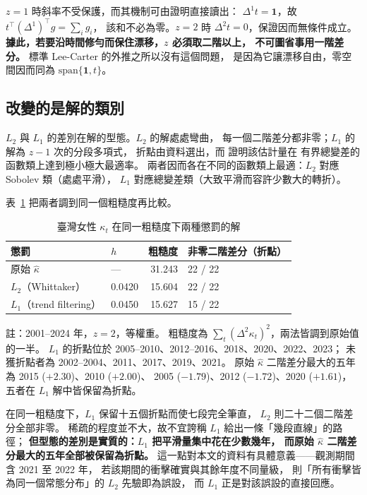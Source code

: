 \documentclass[UTF8, fontset=macnew, a4paper, 12pt]{ctexart}
\begin{document}
$z=1$ 時斜率不受保護，而其機制可由證明直接讀出：
$\Delta^{1}t=\mathbf 1$，故 $t^{\top}(\Delta^{1})^{\top}g=\sum_i g_i$，
該和不必為零。$z=2$ 時 $\Delta^{2}t=0$，保證因而無條件成立。
\textbf{據此，若要沿時間修勻而保住漂移，$z$ 必須取二階以上， 不可圖省事用一階差分。} 標準 Lee-Carter 的外推之所以沒有這個問題，
是因為它讓漂移自由，零空間因而同為 $\mathrm{span}\{\mathbf 1,t\}$。

\subsection{改變的是解的類別}\label{subsec:l1-sol}

$L_2$ 與 $L_1$ 的差別在解的型態。$L_2$ 的解處處彎曲，
每一個二階差分都非零；$L_1$ 的解為 $z-1$ 次的分段多項式，
折點由資料選出，而 \citet{tibshiraniRJ2014} 證明該估計量在
有界總變差的函數類上達到極小極大最適率。
兩者因而各在不同的函數類上最適：$L_2$ 對應 Sobolev 類（處處平滑），
$L_1$ 對應總變差類（大致平滑而容許少數大的轉折）。

表~\ref{tab:l1kappa} 把兩者調到同一個粗糙度再比較。

\begin{table}[H]
\centering
\caption{臺灣女性 $\kappa_t$ 在同一粗糙度下兩種懲罰的解}
\small
\renewcommand{\arraystretch}{1.1}
\begin{tabular}{llrl}
\toprule
懲罰 & $h$ & 粗糙度 & 非零二階差分（折點）\\
\midrule
原始 $\hat\kappa$ & — & 31.243 & 22 / 22\\
$L_2$（Whittaker） & 0.0420 & 15.604 & 22 / 22\\
$L_1$（trend filtering） & 0.0450 & 15.627 & 15 / 22\\
\bottomrule
\end{tabular}

\vspace{2pt}
\parbox{0.92\textwidth}{\footnotesize 註：2001--2024 年，$z=2$，等權重。
粗糙度為 $\sum_t(\Delta^2\kappa_t)^2$，兩法皆調到原始值的一半。
$L_1$ 的折點位於 2005--2010、2012--2016、2018、2020、2022、2023；
未獲折點者為 2002--2004、2011、2017、2019、2021。
原始 $\hat\kappa$ 二階差分最大的五年為 2015 ($+2.30$)、2010 ($+2.00$)、
2005 ($-1.79$)、2012 ($-1.72$)、2020 ($+1.61$)，五者在 $L_1$ 解中皆保留為折點。}
\label{tab:l1kappa}
\end{table}

在同一粗糙度下，$L_1$ 保留十五個折點而使七段完全筆直，
$L_2$ 則二十二個二階差分全部非零。
稀疏的程度並不大，故不宜誇稱 $L_1$ 給出一條「幾段直線」的路徑；
\textbf{但型態的差別是實質的：$L_1$ 把平滑量集中花在少數幾年， 而原始 $\hat\kappa$ 二階差分最大的五年全部被保留為折點。}
這一點對本文的資料有具體意義——觀測期間含 2021 至 2022 年，
若該期間的衝擊確實與其餘年度不同量級，
則「所有衝擊皆為同一個常態分布」的 $L_2$ 先驗即為誤設，
而 $L_1$ 正是對該誤設的直接回應。
\end{document}
